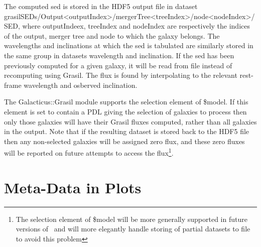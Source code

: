 The computed \gls{sed} is stored in the HDF5 output file in dataset {\normalfont \ttfamily grasilSEDs/Output\textless outputIndex\textgreater/mergerTree\textless treeIndex\textgreater/node\textless nodeIndex\textgreater/SED}, where {\normalfont \ttfamily outputIndeex}, {\normalfont \ttfamily treeIndex} and {\normalfont \ttfamily nodeIndex} are respectively the indices of the output, merger tree and node to which the galaxy belongs. The wavelengths and inclinations at which the \gls{sed} is tabulated are similarly stored in the same group in datasets {\normalfont \ttfamily wavelength} and {\normalfont \ttfamily inclination}. If the \gls{sed} has been previously computed for a given galaxy, it will be read from file instead of recomputing using {\normalfont \ttfamily Grasil}. The flux is found by interpolating to the relevant rest-frame wavelength and osberved inclination.

The {\normalfont \ttfamily Galacticus::Grasil} module supports the {\normalfont \ttfamily selection} element of {\normalfont \ttfamily \$model}. If this element is set to contain a PDL giving the selection of galaxies to process then only those galaxies will have their {\normalfont \ttfamily Grasil} fluxes computed, rather than all galaxies in the output. Note that if the resulting dataset is stored back to the HDF5 file then any non-selected galaxies will be assigned zero flux, and these zero fluxes will be reported on future attempts to access the flux\footnote{The {\normalfont \ttfamily selection} element of {\normalfont \ttfamily \$model} will be more generally supported in future versions of \protect\glc\ and will more elegantly handle storing of partial datasets to file to avoid this problem}.

\section{Meta-Data in Plots}

